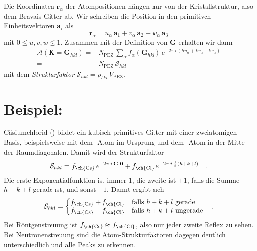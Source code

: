 Die Koordinaten  $\mathbf{r}_\alpha$  der Atompositionen hängen nur von der Kristallstruktur, also dem Bravais-Gitter ab. Wir schreiben die Position in den primitiven Einheitsvektoren $\mathbf{a}_i$ als
\begin{equation}
\mathbf{r}_\alpha = u_\alpha \, \mathbf{a}_1 + v_\alpha \, \mathbf{a}_2 + w_\alpha \, \mathbf{a}_3
\end{equation}
mit $0 \le u,v,w \le 1$. Zusammen mit der Definition von  $ \mathbf{G}$ erhalten wir dann 
\begin{align}
\mathcal{A}(\mathbf{K} = \mathbf{G}_{hkl} ) 
 = &
  N_\text{PEZ}  \, 
\sum_\alpha f_\alpha ( \mathbf{G}_{hkl} ) \, e^{-2 \pi \, i \, ( h u_\alpha + k v_\alpha + l w_\alpha  ) } \\
 = &
 N_\text{PEZ} \, \mathcal{S}_{hkl}
\end{align}
mit dem \emph{Strukturfaktor} $\mathcal{S}_{hkl} = \rho_{hkl} \, V_\text{PEZ} $.


\section{Beispiel: }

Cäsiumchlorid  () bildet ein kubisch-primitives Gitter mit einer zweiatomigen Basis, beispielsweise mit dem -Atom im Ursprung und dem -Atom in der Mitte der Raumdiagonalen. Damit wird der Strukturfaktor 
\begin{equation}
\mathcal{S}_{hkl} = f_\text{\ch{Cs}} \, e^{-2 \pi \, i  \, \mathbf{G} \cdot \mathbf{0}} + f_\text{\ch{Cl}} \, e^{- 2 \pi  \, i \, \frac{1}{2}(h + k + l) }   \quad .
\end{equation}
Die erste Exponentialfunktion ist immer $1$, die zweite ist $+1$, falls die Summe $h + k + l$ gerade ist, und sonst $-1$. Damit ergibt sich
\begin{equation}
  \mathcal{S}_{hkl} = \left\{
  \begin{array}{@{}ll@{}}
    f_\text{\ch{Cs}}  + f_\text{\ch{Cl}}  &\text{falls}\  h+k+l \ \text{gerade} \\
     f_\text{\ch{Cs}}  - f_\text{\ch{Cl}} & \text{falls}\  h+k+l \ \text{ungerade} \\
  \end{array}\right.  \quad .
\end{equation} 
Bei Röntgenstreuung ist $  f_\text{\ch{Cs}}  \approx f_\text{\ch{Cl}}$, also nur jeder zweite Reflex zu sehen. Bei Neutronenstreuung sind die Atom-Strukturfaktoren dagegen deutlich unterschiedlich und alle Peaks zu erkennen.



